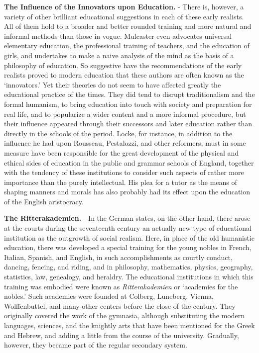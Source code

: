 \documentclass[
]{book}
\begin{document}
\textbf{The Influence of the Innovators upon Education.} - There is, however, a variety of other brilliant educational suggestions in each of these early realists. All of them hold to a broader and better rounded training and more natural and informal methods than those in vogue. Mulcaster even advocates universal elementary education, the professional training of teachers, and the education of girls, and undertakes to make a naive analysis of the mind as the basis of a philosophy of education. So suggestive have the recommendations of the early realists proved to modern education that these authors are often known as the `innovators.' Yet their theories do not seem to have affected greatly the educational practice of the times. They did tend to disrupt traditionalism and the formal humanism, to bring education into touch with society and preparation for real life, and to popularize a wider content and a more informal procedure, but their influence appeared through their successors and later education rather than directly in the schools of the period. Locke, for instance, in addition to the influence he had upon Rousseau, Pestalozzi, and other reformers, must in some measure have been responsible for the great development of the physical and ethical sides of education in the public and grammar schools of England, together with the tendency of these institutions to consider such aspects of rather more importance than the purely intellectual. His plea for a tutor as the means of shaping manners and morals has also probably had its effect upon the education of the English aristocracy.

\textbf{The Ritterakademien.} - In the German states, on the other hand, there arose at the courts during the seventeenth century an actually new type of educational institution as the outgrowth of social realism. Here, in place of the old humanistic education, there was developed a special training for the young nobles in French, Italian, Spanish, and English, in such accomplishments as courtly conduct, dancing, fencing, and riding, and in philosophy, mathematics, physics, geography, statistics, law, genealogy, and heraldry. The educational institutions in which this training was embodied were known as \emph{Ritterakademien} or `academies for the nobles.' Such academies were founded at Colberg, Luneberg, Vienna, Wolffenbuttel, and many other centers before the close of the century. They originally covered the work of the gymnasia, although substituting the modern languages, sciences, and the knightly arts that have been mentioned for the Greek and Hebrew, and adding a little from the course of the university. Gradually, however, they became part of the regular secondary system.
\end{document}
